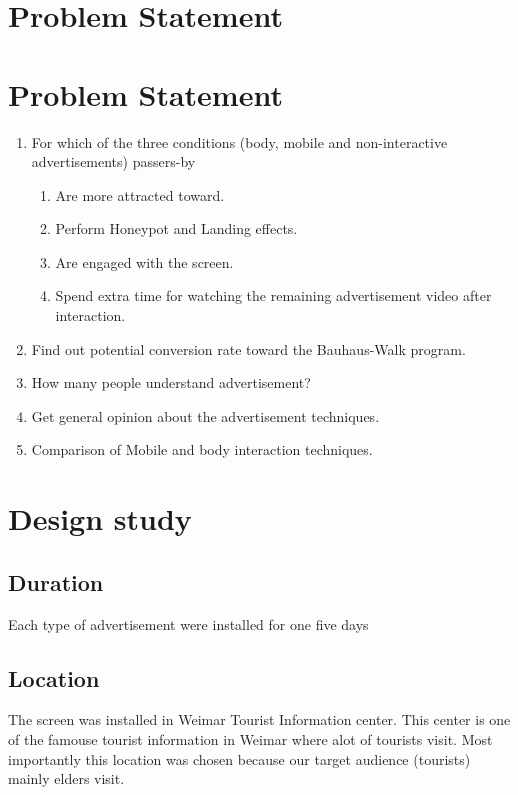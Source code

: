 \section{Problem Statement}



\section{Problem Statement}
\begin{enumerate}

\item	For which of the three conditions (body, mobile and non-interactive advertisements) passers-by 

\begin{enumerate}
\item	Are more attracted toward.
\item	Perform Honeypot and Landing effects.
\item	Are engaged with the screen.
\item	Spend extra time for watching the remaining advertisement video after interaction.
\end{enumerate}

\item   Find out potential conversion rate toward the Bauhaus-Walk program.
\item	How many people understand advertisement?
\item	Get general opinion about the advertisement techniques.
\item	Comparison of Mobile and body interaction techniques.

\end{enumerate}







\section{Design study}


\subsection{Duration}
Each type of advertisement were installed for one five days 


\subsection{Location}
The screen was installed in Weimar Tourist Information center. This center is one of the famouse tourist information in Weimar where alot of tourists visit. Most importantly this location was chosen because our target audience (tourists) mainly elders visit.


